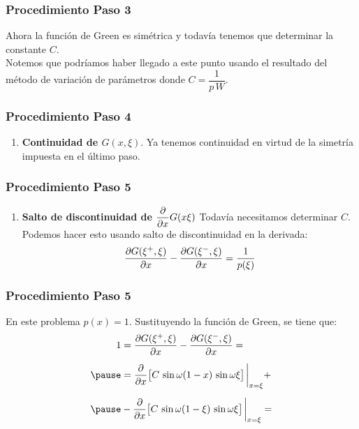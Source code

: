 \documentclass[12pt]{beamer}
\begin{document}
\begin{frame}
\frametitle{Procedimiento Paso 3}
Ahora la función de Green es simétrica y todavía tenemos que determinar la constante $C$.
\\
\bigskip
\pause
Notemos que podríamos haber llegado a este punto usando el resultado del método de variación de parámetros donde $C = \dfrac{1}{p \, W}$.
\end{frame}
\begin{frame}
\frametitle{Procedimiento Paso 4}
\begin{enumerate}[<+->]
\conti
\item \textbf{Continuidad de $G (x, \xi)$}.
\pause
Ya tenemos continuidad en virtud de la simetría impuesta en el último paso.
\seti
\end{enumerate}
\end{frame}
\begin{frame}
\frametitle{Procedimiento Paso 5}
\begin{enumerate}[<+->]
\conti
\item \textbf{Salto de discontinuidad de $\displaystyle \pdv{x} G (x \xi)$}
\pause
Todavía necesitamos determinar $C$. Podemos hacer esto usando salto de discontinuidad en la derivada:
\pause
\begin{align*}
\pdv{G (\xi^{+}, \xi)}{x} - \pdv{G (\xi^{-}, \xi)}{x} = \dfrac{1}{p (\xi)}
\end{align*}
\end{enumerate}
\end{frame}
\begin{frame}
\frametitle{Procedimiento Paso 5}
En este problema $p (x) = 1$. Sustituyendo la función de Green, se tiene que:
\pause
\begin{eqnarray*}
\begin{aligned}[b]
1 & = \pdv{G (\xi^{+}, \xi)}{x} - \pdv{G (\xi^{-}, \xi)}{x} = \\[0.5em] \pause
&= \pdv{x} \big[ C \, \sin \omega (1 - x) \, \sin \omega \xi \big] \eval_{x = \xi} + \\[0.5em] \pause
&- \pdv{x} \big[ C \, \sin \omega (1 - \xi) \, \sin \omega \xi \big] \eval_{x = \xi} = 
\end{aligned}
\end{eqnarray*}
\end{frame}
\end{document}
